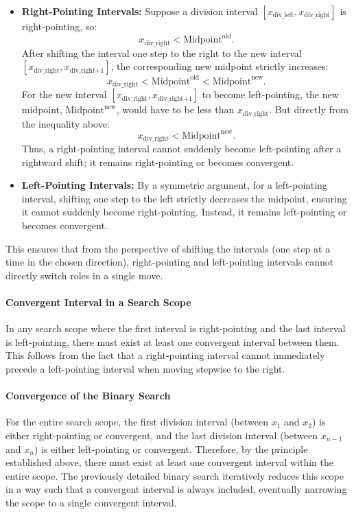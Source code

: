 \begin{itemize}
    \item \textbf{Right-Pointing Intervals:}  
    Suppose a division interval \([x_{\text{div\_left}}, x_{\text{div\_right}}]\) is right-pointing, so:
    \[
    x_{\text{div\_right}} < \text{Midpoint}^{\text{old}}.
    \]
    After shifting the interval one step to the right to the new interval \([x_{\text{div\_right}}, x_{\text{div\_right+1}}]\), the corresponding new midpoint strictly increases:
    \[
    x_{\text{div\_right}} < \text{Midpoint}^{\text{old}} < \text{Midpoint}^{\text{new}}.
    \]
    For the new interval  \([x_{\text{div\_right}}, x_{\text{div\_right+1}}]\) to become left-pointing, the new midpoint, $\text{Midpoint}^{\text{new}}$, would have to be less than \(x_{\text{div\_right}}\). But directly from the inequality above:
    \[
    x_{\text{div\_right}} < \text{Midpoint}^{\text{new}}.
    \]
    Thus, a right-pointing interval cannot suddenly become left-pointing after a rightward shift; it remains right-pointing or becomes convergent.

    \item \textbf{Left-Pointing Intervals:}  
    By a symmetric argument, for a left-pointing interval, shifting one step to the left strictly decreases the midpoint, ensuring it cannot suddenly become right-pointing. Instead, it remains left-pointing or becomes convergent.
\end{itemize}

This ensures that from the perspective of shifting the intervals (one step at a time in the chosen direction), right-pointing and left-pointing intervals cannot directly switch roles in a single move.

\paragraph{Convergent Interval in a Search Scope}
In any search scope where the first interval is right-pointing and the last interval is left-pointing, there must exist at least one convergent interval between them. This follows from the fact that a right-pointing interval cannot immediately precede a left-pointing interval when moving stepwise to the right.

\paragraph{Convergence of the Binary Search}
For the entire search scope, the first division interval (between \(x_1\) and \(x_2\)) is either right-pointing or convergent, and the last division interval (between \(x_{n-1}\) and \(x_n\)) is either left-pointing or convergent. Therefore, by the principle established above, there must exist at least one convergent interval within the entire scope. The previously detailed binary search iteratively reduces this scope in a way such that a convergent interval is always included, eventually narrowing the scope to a single convergent interval.

